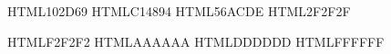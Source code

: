 
\definecolor{AzulITM}     {HTML}{102D69}   %
\definecolor{Magenta}     {HTML}{C14894}   %
\definecolor{AzulDigital} {HTML}{56ACDE}   %
\definecolor{GrisPizarra} {HTML}{2F2F2F}   %

\definecolor{GrisClaro}   {HTML}{F2F2F2}
\definecolor{GrisMedio}   {HTML}{AAAAAA}
\definecolor{GrisLinea}   {HTML}{DDDDDD}
\definecolor{Blanco}      {HTML}{FFFFFF}
